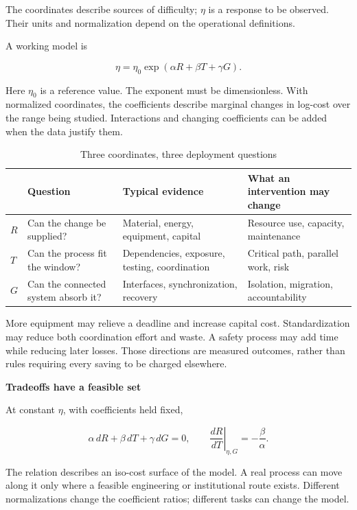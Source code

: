 \documentclass[11pt,openany]{book}
\newcommand{\subhead}[1]{\par\medskip\noindent\textbf{#1}\par\nobreak\smallskip}
\begin{document}
The coordinates describe sources of difficulty; $\eta$ is a response to be observed. Their units and normalization depend on the operational definitions.

A working model is

\begin{equation}
\eta=\eta_0\exp(\alpha R+\beta T+\gamma G).
\label{eq:eta-exp}
\end{equation}

Here $\eta_0$ is a reference value. The exponent must be dimensionless. With normalized coordinates, the coefficients describe marginal changes in log-cost over the range being studied. Interactions and changing coefficients can be added when the data justify them.

\begin{table}[ht]
\centering
\caption{Three coordinates, three deployment questions}
\label{tab:ch2-rtg}
{\small
\begin{tabularx}{\textwidth}{@{}lYYY@{}}
\toprule
 & Question & Typical evidence & What an intervention may change\\
\midrule
$R$ & Can the change be supplied? & Material, energy, equipment, capital & Resource use, capacity, maintenance\\
$T$ & Can the process fit the window? & Dependencies, exposure, testing, coordination & Critical path, parallel work, risk\\
$G$ & Can the connected system absorb it? & Interfaces, synchronization, recovery & Isolation, migration, accountability\\
\bottomrule
\end{tabularx}}
\end{table}

More equipment may relieve a deadline and increase capital cost. Standardization may reduce both coordination effort and waste. A safety process may add time while reducing later losses. Those directions are measured outcomes, rather than rules requiring every saving to be charged elsewhere.

\subhead{Tradeoffs have a feasible set}

At constant $\eta$, with coefficients held fixed,

\begin{equation}
\alpha\,dR+\beta\,dT+\gamma\,dG=0,
\qquad
\left.\frac{dR}{dT}\right|_{\eta,G}=-\frac{\beta}{\alpha}.
\end{equation}

The relation describes an iso-cost surface of the model. A real process can move along it only where a feasible engineering or institutional route exists. Different normalizations change the coefficient ratios; different tasks can change the model.
\end{document}
